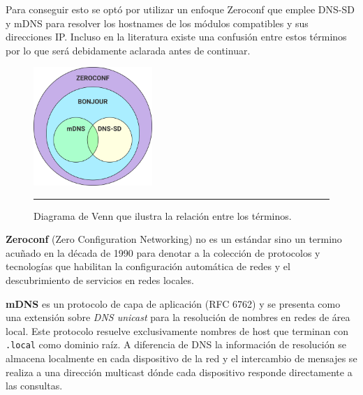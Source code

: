 Para conseguir esto se optó por utilizar un enfoque Zeroconf que emplee DNS-SD y mDNS para resolver los hostnames de los módulos compatibles y sus direcciones IP. Incluso en la literatura existe una confusión entre estos términos por lo que será debidamente aclarada antes de continuar.

\begin{figure}[htbp]
	\centering
	\includegraphics[width=0.4\textwidth]{Figures/design/zeroconf_venn.png}
	\rule{35em}{1pt}
	\caption[Connection Diagram]{Diagrama de Venn que ilustra la relación entre los términos.}
	\label{fig:zeroconf_venn}
\end{figure}

\textbf{Zeroconf} (Zero Configuration Networking) no es un estándar sino un termino acuñado en la década de 1990 para denotar a la colección de protocolos y tecnologías que habilitan la configuración automática de redes y el descubrimiento de servicios en redes locales.

\textbf{mDNS} es un protocolo de capa de aplicación (RFC 6762) y se presenta como una extensión sobre \emph{DNS unicast} para la resolución de nombres en redes de área local. Este protocolo resuelve exclusivamente nombres de host que terminan con \texttt{.local} como dominio raíz. A diferencia de DNS la información de resolución se almacena localmente en cada dispositivo de la red y el intercambio de mensajes se realiza a una dirección multicast dónde cada dispositivo responde directamente a las consultas. 

